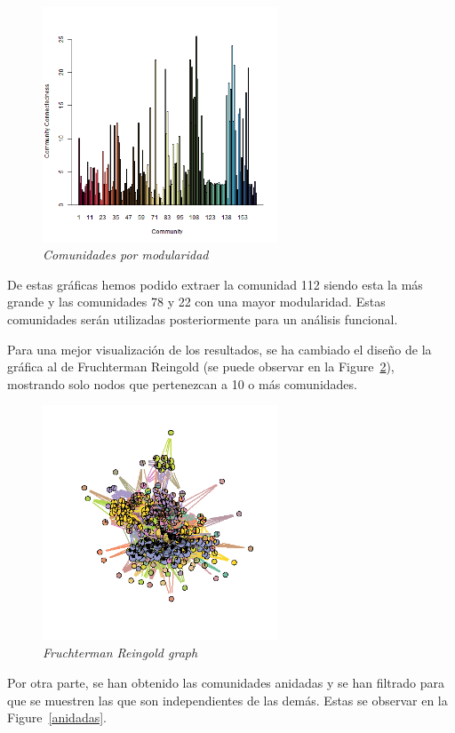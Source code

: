 \begin{figure}[H]
	\centering
	\includegraphics[width=70mm,scale=1.2]{figures/clusters_modularity.png}
	\caption{\textit{Comunidades por modularidad}}
	\label{comModularidad}
\end{figure}

De estas gráficas hemos podido extraer la comunidad 112 siendo esta la más grande y las comunidades 78 y 22 con una mayor modularidad. Estas comunidades serán utilizadas posteriormente para un análisis funcional.

Para una mejor visualización de los resultados, se ha cambiado el diseño de la gráfica al de Fruchterman Reingold (se puede observar en la Figure~\ref{FRg}), mostrando solo nodos que pertenezcan a 10 o más comunidades.

\begin{figure}[h]
	\centering
	\includegraphics[width=70mm,scale=1.2]{figures/hits.network_layout_fruchterman.reingold_shownodesin_10.png}
	\caption{\textit{Fruchterman Reingold graph}}
	\label{FRg}
\end{figure}

Por otra parte, se han obtenido las comunidades anidadas y se han filtrado para que se muestren las que son independientes de las demás. Estas se observar en la Figure~\ref{anidadas}.

